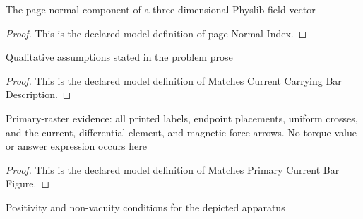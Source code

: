\begin{definition}
  \label{def:physics:phyx-mini-0949:phyxminiproblems-problemphyxmini0949-pagenormalindex}
  The page-normal component of a three-dimensional Physlib field vector
\end{definition}
\begin{proof}
  This is the declared model definition of page Normal Index.
\end{proof}
\begin{definition}
  \label{def:physics:phyx-mini-0949:phyxminiproblems-problemphyxmini0949-matchescurrentcarryingbardescription}
  Qualitative assumptions stated in the problem prose
\end{definition}
\begin{proof}
  This is the declared model definition of Matches Current Carrying Bar Description.
\end{proof}
\begin{definition}
  \label{def:physics:phyx-mini-0949:phyxminiproblems-problemphyxmini0949-matchesprimarycurrentbarfigure}
  Primary-raster evidence: all printed labels, endpoint placements, uniform crosses, and the current, differential-element, and magnetic-force arrows. No torque value or answer expression occurs here
\end{definition}
\begin{proof}
  This is the declared model definition of Matches Primary Current Bar Figure.
\end{proof}
\begin{definition}
  \label{def:physics:phyx-mini-0949:phyxminiproblems-problemphyxmini0949-hasphysicalcurrentbarparameters}
  Positivity and non-vacuity conditions for the depicted apparatus
\end{definition}
